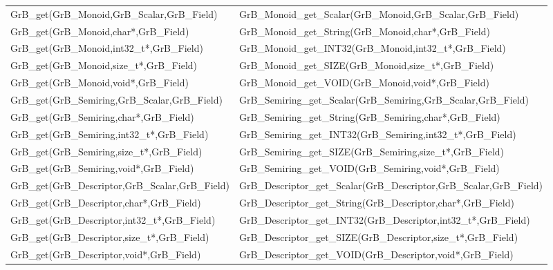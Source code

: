\begin{table}[htb]
{\begin{tabular}{l|l}
{\sf GrB\_get(GrB\_Monoid,GrB\_Scalar,GrB\_Field)}  & {\sf GrB\_Monoid\_get\_Scalar(GrB\_Monoid,GrB\_Scalar,GrB\_Field)} \\
{\sf GrB\_get(GrB\_Monoid,char*,GrB\_Field)}        & {\sf GrB\_Monoid\_get\_String(GrB\_Monoid,char*,GrB\_Field)}       \\
{\sf GrB\_get(GrB\_Monoid,int32\_t*,GrB\_Field)}      & {\sf GrB\_Monoid\_get\_INT32(GrB\_Monoid,int32\_t*,GrB\_Field)}   \\
{\sf GrB\_get(GrB\_Monoid,size\_t*,GrB\_Field)}       & {\sf GrB\_Monoid\_get\_SIZE(GrB\_Monoid,size\_t*,GrB\_Field)}    \\
{\sf GrB\_get(GrB\_Monoid,void*,GrB\_Field)}          & {\sf GrB\_Monoid\_get\_VOID(GrB\_Monoid,void*,GrB\_Field)}       \\
\hline

{\sf GrB\_get(GrB\_Semiring,GrB\_Scalar,GrB\_Field)}  & {\sf GrB\_Semiring\_get\_Scalar(GrB\_Semiring,GrB\_Scalar,GrB\_Field)} \\
{\sf GrB\_get(GrB\_Semiring,char*,GrB\_Field)}        & {\sf GrB\_Semiring\_get\_String(GrB\_Semiring,char*,GrB\_Field)}       \\
{\sf GrB\_get(GrB\_Semiring,int32\_t*,GrB\_Field)}      & {\sf GrB\_Semiring\_get\_INT32(GrB\_Semiring,int32\_t*,GrB\_Field)}   \\
{\sf GrB\_get(GrB\_Semiring,size\_t*,GrB\_Field)}       & {\sf GrB\_Semiring\_get\_SIZE(GrB\_Semiring,size\_t*,GrB\_Field)}    \\
{\sf GrB\_get(GrB\_Semiring,void*,GrB\_Field)}          & {\sf GrB\_Semiring\_get\_VOID(GrB\_Semiring,void*,GrB\_Field)}       \\
\hline

{\sf GrB\_get(GrB\_Descriptor,GrB\_Scalar,GrB\_Field)}  & {\sf GrB\_Descriptor\_get\_Scalar(GrB\_Descriptor,GrB\_Scalar,GrB\_Field)} \\
{\sf GrB\_get(GrB\_Descriptor,char*,GrB\_Field)}        & {\sf GrB\_Descriptor\_get\_String(GrB\_Descriptor,char*,GrB\_Field)}       \\
{\sf GrB\_get(GrB\_Descriptor,int32\_t*,GrB\_Field)}      & {\sf GrB\_Descriptor\_get\_INT32(GrB\_Descriptor,int32\_t*,GrB\_Field)}   \\
{\sf GrB\_get(GrB\_Descriptor,size\_t*,GrB\_Field)}       & {\sf GrB\_Descriptor\_get\_SIZE(GrB\_Descriptor,size\_t*,GrB\_Field)}    \\
{\sf GrB\_get(GrB\_Descriptor,void*,GrB\_Field)}          & {\sf GrB\_Descriptor\_get\_VOID(GrB\_Descriptor,void*,GrB\_Field)}       \\
\hline


\end{tabular}}
\end{table}
